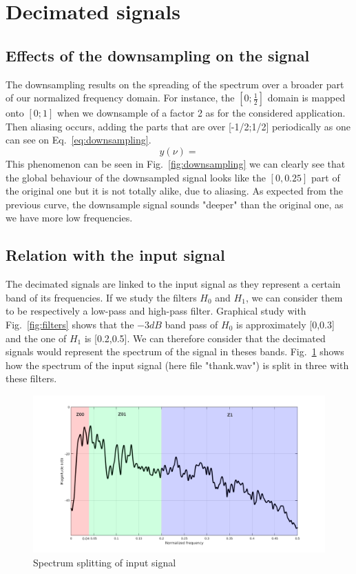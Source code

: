 \documentclass[a4paper,twocolumn]{article}
\begin{document}
\section{Decimated signals}
\label{sec:decimated}

\subsection{Effects of the downsampling on the signal}
The downsampling results on the spreading of the spectrum over a broader part of our normalized frequency domain. For instance, the $[0;\frac{1}{2}]$ domain is mapped onto $[0;1]$ when we downsample of a factor 2 as for the considered application. Then aliasing occurs, adding the parts that are over [-1/2;1/2] periodically as one can see on Eq.~\ref{eq:downsampling}. 
\begin{equation}
  \label{eq:downsampling}
y(\nu)=
\end{equation}
This phenomenon can be seen in Fig.~\ref{fig:downsampling} we can clearly see that the global behaviour of the downsampled signal looks like the $[0,0.25]$ part of the original one but it is not totally alike, due to aliasing. As expected from the previous curve, the downsample signal sounds "deeper" than the original one, as we have more low frequencies.


\subsection{Relation with the input signal}
The decimated signals are linked to the input signal as they represent a certain band of its frequencies. If we study the filters $H_{0}$ and $H_{1}$, we can consider them to be respectively a low-pass and high-pass filter. Graphical study with Fig.~\ref{fig:filters} shows that the $-3dB$ band pass of $H_{0}$ is approximately [0,0.3] and the one of $H_{1}$ is [0.2,0.5]. We can therefore consider that the decimated signals would represent the spectrum of the signal in theses bands. Fig.~\ref{fig:spect} shows how the spectrum of the input signal (here file "thank.wav") is split in three with these filters.

\begin{figure}[!ht]
  \begin{center}
    \includegraphics[width=1.1\columnwidth]{Thank_spectrum3.png}
  \end{center}
  \caption{Spectrum splitting of input signal}
  \label{fig:spect}
\end{figure}
\end{document}
